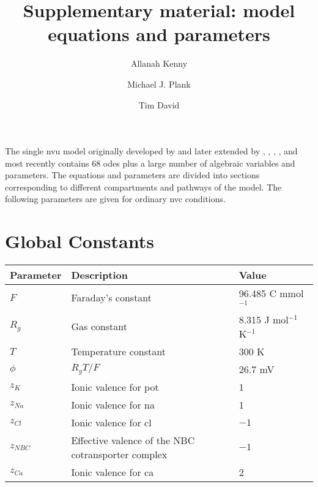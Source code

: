 \documentclass[11pt]{elsarticle}
\newcommand{\JmolK}{J mol$^{-1}$ K$^{-1}$\xspace}
\newcommand{\n}{$^{-1}$\xspace}
\newcommand{\na}{\gls{na}\xspace}
\newcommand{\pot}{\gls{pot}\xspace}
\newcommand{\cl}{\gls{cl}\xspace}
\newcommand{\ca}{\gls{ca}\xspace}
\begin{document}
\begin{frontmatter}
	
	\title{\vspace{-2cm}Supplementary material: model equations and parameters}
	
	
	\author[1]{Allanah Kenny}
	\author[2]{Michael J. Plank}
	\author[1]{Tim David}
	
	\address[1]{High Performance Computing Centre, University of Canterbury, New Zealand}
	\address[2]{Department of Mathematics and Statistics, University of Canterbury, New Zealand}
	
\end{frontmatter}

The single \gls{nvu} model originally developed by \citet{Farr2011} and later extended by \citet{Dormanns2015}, \citet{Dormanns2016}, \citet{Mathias2017}, \citet{Kenny2018}, and most recently \citet{Mathias2018} contains 68 \glspl{ode} plus a large number of algebraic variables and parameters. The equations and parameters are divided into sections corresponding to different compartments and pathways of the model.
The following parameters are given for ordinary \gls{nvc} conditions.


\section{Global Constants}
\begin{longtable}[h!]{ p{0.12\linewidth}   p{0.6\linewidth}   p{0.28\linewidth} }
	\hline
	Parameter & Description & Value \\
	\hline

$F$			& Faraday's constant 	& 96.485 C mmol\n				\\
$R_g$ 			& Gas constant 				& 8.315 \JmolK	 \\
$T$ 	    	& Temperature constant								& 300 K	\\
$\phi$ 		& $R_g T / F$				& 26.7 mV \\		
$z_K$			& Ionic valence for \pot 										& 1   \\ 
$z_{Na}$			& Ionic valence for \na 											& 1   \\ 
$z_{Cl}$			& Ionic valence for \cl 											& $-1$  \\ 
$z_{NBC}$ 		& Effective valence of the NBC cotransporter complex 				& $-1$ \\
$z_{Ca}$  & Ionic valence for \ca & 2 \\
	\hline
\end{longtable}
\end{document}
